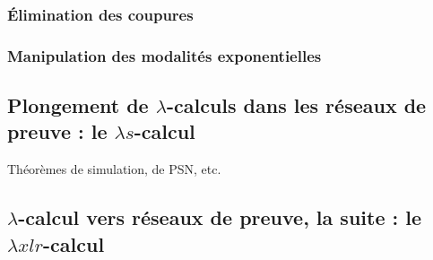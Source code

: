 \documentclass[a4paper, 11pt]{article}
\begin{document}
\subsubsection{\'Elimination des coupures}

\subsubsection{Manipulation des modalités exponentielles}

\subsection{Plongement de $\lambda$-calculs dans les réseaux de preuve : le $\lambda s$-calcul}

Théorèmes de simulation, de PSN, etc. 

\subsection{$\lambda$-calcul vers réseaux de preuve, la suite : le $\lambda x l r$-calcul}
\end{document}
